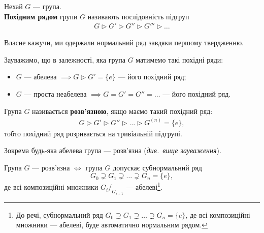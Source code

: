 \documentclass{math_library}
\begin{document}
\begin{definition}
Нехай $G$ --- група.\\
\textbf{Похідним рядом} групи $G$ називають послідовність підгруп
\begin{align*}
G \triangleright G' \triangleright G'' \triangleright G''' \triangleright \dots
\end{align*}
\end{definition}

\begin{remark}
Власне кажучи, ми одержали нормальний ряд завдяки першому твердженню.
\end{remark}

\begin{remark}
Зауважимо, що в залежності, яка група $G$ матимемо такі похідні ряди:
\begin{itemize}[nosep,wide=0pt]
\item $G$ --- абелева $\implies G \triangleright G' = \{e\}$ --- його похідний ряд;
\item $G$ --- проста неабелева $\implies G = G' = G'' = \dots$ --- його похідний ряд.
\end{itemize}
\end{remark}

\begin{definition}
Група $G$ називається \textbf{розв'язною}, якщо маємо такий похідний ряд:
\begin{align*}
G \triangleright G' \triangleright G'' \triangleright \dots \triangleright G^{(n)} = \{e\},
\end{align*}
тобто похідний ряд розривається на тривіальній підгрупі.
\end{definition}

\begin{example}
Зокрема будь-яка абелева група --- розв'язна (\textit{див.\ вище зауваження}).
\end{example}

\begin{proposition}
Група $G$ --- розв'язна $\iff$ група $G$ допускає субнормальний ряд 
\[
G_0 \supsetneq G_1 \supsetneq \dots \supsetneq G_n = \{e\},
\]
де всі композиційні множники ${G_i}/_{G_{i+1}}$ --- абелеві\footnote{До речі, субнормальний ряд $G_0 \supsetneq G_1 \supsetneq \dots \supsetneq G_n = \{e\}$, де всі композиційні множники --- абелеві, буде автоматично нормальним рядом.}.
\end{proposition}
\end{document}

